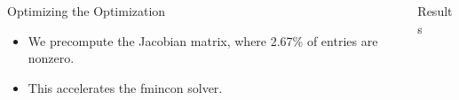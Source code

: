 \documentclass[final]{beamer}
\begin{document}
\begin{frame}{}
{\begin{columns}[t]
\begin{column}{.30\linewidth}
\begin{block}{\centering Optimizing the Optimization}



	\begin{itemize}
		\item We precompute the Jacobian matrix, where 2.67\% of entries are nonzero.
		\item This accelerates the fmincon solver.
	\end{itemize}



\end{block}

   

                

 \end{column}
        
\begin{column}{.30\linewidth}



                
\begin{block}{\centering Results}


\end{block}
\end{column}
\end{columns}}
\end{frame}
\end{document}
